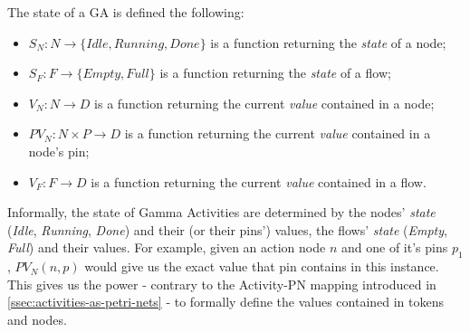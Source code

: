\begin{definition}
	The state of a GA is defined the following:
	
	\begin{itemize}
		\item \(S_N : N \rightarrow \{ \mathit{Idle}, \mathit{Running}, \mathit{Done} \} \) is a function returning the \emph{state} of a node;
		\item \(S_F : F \rightarrow \{ \mathit{Empty}, \mathit{Full} \} \) is a function returning the \emph{state} of a flow;
		\item \(V_N : N \rightarrow D \) is a function returning the current \emph{value} contained in a node;
		\item \(\mathit{PV}_N : N \times P \rightarrow D \) is a function returning the current \emph{value} contained in a node's pin;
		\item \(V_F : F \rightarrow D \) is a function returning the current \emph{value} contained in a flow.
	\end{itemize}
	
\end{definition}

Informally, the state of Gamma Activities are determined by the nodes' \emph{state} (\emph{Idle}, \emph{Running}, \emph{Done}) and their (or their pins') values, the flows' \emph{state} (\emph{Empty}, \emph{Full}) and their values. For example, given an action node \(n\) and one of it's pins \(p_1\), \(\mathit{PV}_N(n, p)\) would give us the exact value that pin contains in this instance. This gives us the power - contrary to the Activity-PN mapping introduced in \autoref{ssec:activities-as-petri-nets} - to formally define the values contained in tokens and nodes.

